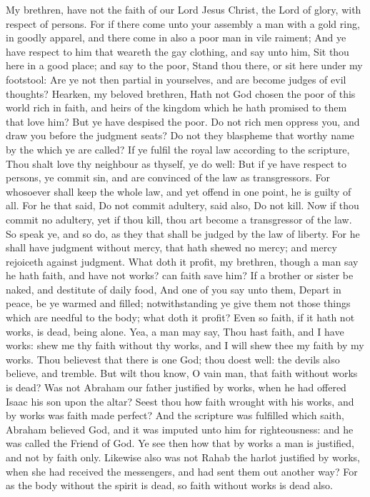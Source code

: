  My brethren, have not the faith of our Lord Jesus Christ,
the Lord of glory, with respect of persons.  For if there
come unto your assembly a man with a gold ring, in goodly apparel, and
there come in also a poor man in vile raiment;  And ye
have respect to him that weareth the gay clothing, and say unto him, Sit
thou here in a good place; and say to the poor, Stand thou there, or sit
here under my footstool:  Are ye not then partial in
yourselves, and are become judges of evil thoughts? 
Hearken, my beloved brethren, Hath not God chosen the poor of this world
rich in faith, and heirs of the kingdom which he hath promised to them
that love him?  But ye have despised the poor. Do not rich
men oppress you, and draw you before the judgment seats? 
Do not they blaspheme that worthy name by the which ye are called?
 If ye fulfil the royal law according to the scripture,
Thou shalt love thy neighbour as thyself, ye do well:  But
if ye have respect to persons, ye commit sin, and are convinced of the
law as transgressors.  For whosoever shall keep the whole
law, and yet offend in one point, he is guilty of all. 
For he that said, Do not commit adultery, said also, Do not kill. Now if
thou commit no adultery, yet if thou kill, thou art become a
transgressor of the law.  So speak ye, and so do, as they
that shall be judged by the law of liberty.  For he shall
have judgment without mercy, that hath shewed no mercy; and mercy
rejoiceth against judgment.  What doth it profit, my
brethren, though a man say he hath faith, and have not works? can faith
save him?  If a brother or sister be naked, and destitute
of daily food,  And one of you say unto them, Depart in
peace, be ye warmed and filled; notwithstanding ye give them not those
things which are needful to the body; what doth it profit?
 Even so faith, if it hath not works, is dead, being
alone.  Yea, a man may say, Thou hast faith, and I have
works: shew me thy faith without thy works, and I will shew thee my
faith by my works.  Thou believest that there is one God;
thou doest well: the devils also believe, and tremble. 
But wilt thou know, O vain man, that faith without works is dead?
 Was not Abraham our father justified by works, when he
had offered Isaac his son upon the altar?  Seest thou how
faith wrought with his works, and by works was faith made perfect?
 And the scripture was fulfilled which saith, Abraham
believed God, and it was imputed unto him for righteousness: and he was
called the Friend of God.  Ye see then how that by works
a man is justified, and not by faith only.  Likewise also
was not Rahab the harlot justified by works, when she had received the
messengers, and had sent them out another way?  For as
the body without the spirit is dead, so faith without works is dead
also.

